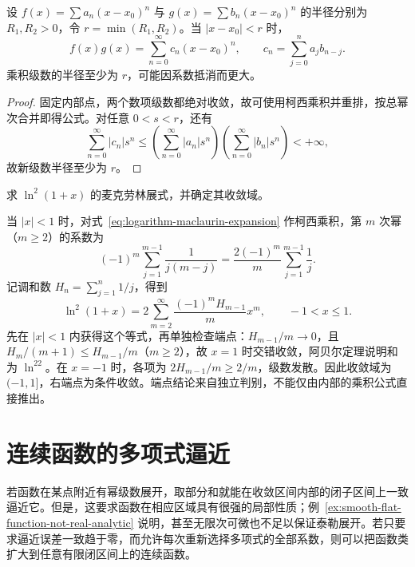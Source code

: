 \documentclass[UTF8,12pt,a4paper,fontset=fandol]{ctexbook}
\begin{document}
\begin{proposition}[幂级数的乘积]
\label{prop:product-of-power-series}
设 $f(x)=\sum a_n(x-x_0)^n$ 与 $g(x)=\sum b_n(x-x_0)^n$ 的半径分别为 $R_1,R_2>0$，令 $r=\min(R_1,R_2)$。当 $|x-x_0|<r$ 时，
\begin{equation}
    f(x)g(x)=\sum_{n=0}^\infty c_n(x-x_0)^n,
    \qquad c_n=\sum_{j=0}^na_jb_{n-j}.
    \label{eq:cauchy-product-of-power-series}
\end{equation}
乘积级数的半径至少为 $r$，可能因系数抵消而更大。
\end{proposition}

\begin{proof}
固定内部点，两个数项级数都绝对收敛，故可使用柯西乘积并重排，按总幂次合并即得公式。对任意 $0<s<r$，还有
\[
    \sum_{n=0}^\infty|c_n|s^n
       \leq\left(\sum_{n=0}^\infty|a_n|s^n\right)
          \left(\sum_{n=0}^\infty|b_n|s^n\right)<+\infty,
\]
故新级数半径至少为 $r$。
\end{proof}

\begin{example}
\label{ex:square-logarithm-maclaurin-expansion}
求 $\ln^2(1+x)$ 的麦克劳林展式，并确定其收敛域。
\end{example}

\begin{solve}
当 $|x|<1$ 时，对式~\eqref{eq:logarithm-maclaurin-expansion} 作柯西乘积，第 $m$ 次幂（$m\geq2$）的系数为
\[
    (-1)^m\sum_{j=1}^{m-1}\frac1{j(m-j)}
       =\frac{2(-1)^m}{m}\sum_{j=1}^{m-1}\frac1j.
\]
记调和数 $H_n=\sum_{j=1}^n1/j$，得到
\begin{equation}
    \ln^2(1+x)=2\sum_{m=2}^\infty
        \frac{(-1)^mH_{m-1}}m x^m,
    \qquad -1<x\leq1.
    \label{eq:square-logarithm-maclaurin-expansion}
\end{equation}
先在 $|x|<1$ 内获得这个等式，再单独检查端点：$H_{m-1}/m\to0$，且 $H_m/(m+1)\leq H_{m-1}/m$（$m\geq2$），故 $x=1$ 时交错收敛，阿贝尔定理说明和为 $\ln^22$。在 $x=-1$ 时，各项为 $2H_{m-1}/m\geq2/m$，级数发散。因此收敛域为 $(-1,1]$，右端点为条件收敛。端点结论来自独立判别，不能仅由内部的乘积公式直接推出。
\end{solve}

\section{连续函数的多项式逼近}
\label{sec:polynomial-approximation-of-continuous-functions}

若函数在某点附近有幂级数展开，取部分和就能在收敛区间内部的闭子区间上一致逼近它。但是，这要求函数在相应区域具有很强的局部性质；例~\ref{ex:smooth-flat-function-not-real-analytic} 说明，甚至无限次可微也不足以保证泰勒展开。若只要求逼近误差一致趋于零，而允许每次重新选择多项式的全部系数，则可以把函数类扩大到任意有限闭区间上的连续函数。
\end{document}
